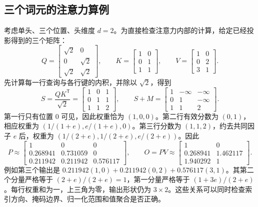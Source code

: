 \subsection{三个词元的注意力算例}
\label{l12:subsec:example}

考虑单头、三个位置、头维度 $d=2$。为直接检查注意力内部的计算，给定已经投影得到的三个矩阵：
\begin{equation}
 Q=\begin{bmatrix}\sqrt2&0\\0&\sqrt2\\\sqrt2&\sqrt2\end{bmatrix},\qquad
 K=\begin{bmatrix}1&0\\0&1\\1&1\end{bmatrix},\qquad
 V=\begin{bmatrix}1&0\\0&2\\3&1\end{bmatrix}.
 \label{l12:eq:example-qkv}
\end{equation}
先计算每一行查询与各行键的内积，并除以 $\sqrt2$，得到
\begin{equation}
 S=\frac{QK^{\mathsf T}}{\sqrt2}
 =\begin{bmatrix}1&0&1\\0&1&1\\1&1&2\end{bmatrix},\qquad
 S+M=\begin{bmatrix}1&-\infty&-\infty\\0&1&-\infty\\1&1&2\end{bmatrix}.
 \label{l12:eq:example-score}
\end{equation}
第一行只有位置 $0$ 可见，因此权重恰为 $(1,0,0)$。第二行有效分数为 $(0,1)$，相应权重为 $(1/(1+e),e/(1+e),0)$。第三行分数为 $(1,1,2)$，约去共同因子 $e$ 后，权重为 $(1/(2+e),1/(2+e),e/(2+e))$。因此
\begin{equation}
 P\approx
 \begin{bmatrix}
 1&0&0\\
 0.268941&0.731059&0\\
 0.211942&0.211942&0.576117
 \end{bmatrix},\qquad
 O=PV\approx
 \begin{bmatrix}
 1&0\\
 0.268941&1.462117\\
 1.940292&1
 \end{bmatrix}.
 \label{l12:eq:example-output}
\end{equation}
例如第三个输出是 $0.211942(1,0)+0.211942(0,2)+0.576117(3,1)$。其第二个分量严格等于 $(2+e)/(2+e)=1$，第一分量严格等于 $(1+3e)/(2+e)$。每行权重和为一，上三角为零，输出形状仍为 $3\times2$。这些关系可以同时检查索引方向、掩码边界、归一化范围和值聚合是否正确。
